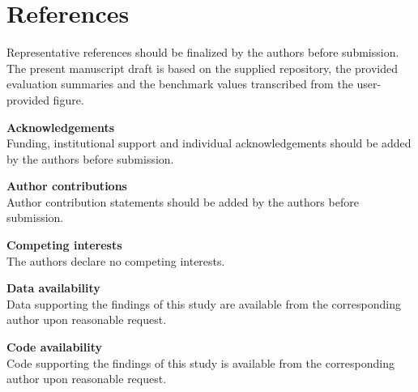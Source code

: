 \documentclass[fleqn,10pt]{wlscirep}
\begin{document}
\section*{References}
Representative references should be finalized by the authors before submission. The present manuscript draft is based on the supplied repository, the provided evaluation summaries and the benchmark values transcribed from the user-provided figure.

\noindent\textbf{Acknowledgements}\\
Funding, institutional support and individual acknowledgements should be added by the authors before submission.

\noindent\textbf{Author contributions}\\
Author contribution statements should be added by the authors before submission.

\noindent\textbf{Competing interests}\\
The authors declare no competing interests.

\noindent\textbf{Data availability}\\
Data supporting the findings of this study are available from the corresponding author upon reasonable request.

\noindent\textbf{Code availability}\\
Code supporting the findings of this study is available from the corresponding author upon reasonable request.
\end{document}
